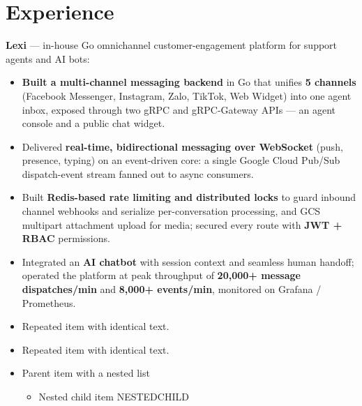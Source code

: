 \section{Experience}
\hspace{1em}\textbf{Lexi} --- in-house Go omnichannel customer-engagement platform for support agents and AI bots:
\vspace{-0.2em}
\begin{itemize}
    \item \textbf{Built a multi-channel messaging backend} in Go that unifies \textbf{5 channels} (Facebook Messenger, Instagram, Zalo, TikTok, Web Widget) into one agent inbox, exposed through two gRPC and gRPC-Gateway APIs --- an agent console and a public chat widget.

    \vspace{-0.6em}
    \item Delivered \textbf{real-time, bidirectional messaging over WebSocket} (push, presence, typing) on an event-driven core: a single Google Cloud Pub/Sub dispatch-event stream fanned out to async consumers.

    \vspace{-0.6em}
    \item Built \textbf{Redis-based rate limiting and distributed locks} to guard inbound channel webhooks and serialize per-conversation processing, and GCS multipart attachment upload for media; secured every route with \textbf{JWT + RBAC} permissions.

    \vspace{-0.6em}
    \item Integrated an \textbf{AI chatbot} with session context and seamless human handoff; operated the platform at peak throughput of \textbf{20,000+ message dispatches/min} and \textbf{8,000+ events/min}, monitored on Grafana / Prometheus.
    \item Repeated item with identical text.
    \item Repeated item with identical text.
    \item Parent item with a nested list
    \begin{itemize}
        \item Nested child item NESTEDCHILD
    \end{itemize}
\end{itemize}
